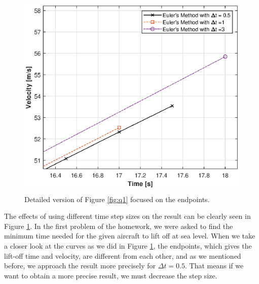 \documentclass[letterpaper,12pt]{article}
\begin{document}
\newpage
\begin{figure}[ht]
        \centering \includegraphics[max height=10cm]{graphs/question1_finaltime.eps}
        \caption{Detailed version of Figure \ref{fig:q1} focused on the endpoints.}
        \label{fig:q1_closer}
\end{figure}

 The effects of using different time step sizes on the result can be clearly seen in Figure \ref{fig:q1_closer}.
 In the first problem of the homework, we were asked to find the minimum time needed for the given aircraft to
 lift off at sea level. When we take a closer look at the curves as we did in Figure \ref{fig:q1_closer}, the
 endpoints, which gives the lift-off time and velocity, are different from each other, and as we mentioned 
 before, we approach the result more precisely for $ \Delta t = 0.5 $. That means if we want to obtain a more precise result, 
 we must decrease the step size.
\newpage
\end{document}
